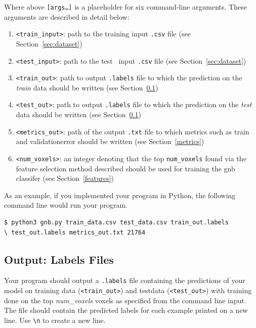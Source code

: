 \documentclass[11pt,addpoints,answers]{exam}
\begin{document}
Where above \texttt{[args\dots]} is a placeholder for six command-line arguments. These arguments are described in detail below:
\begin{enumerate}
    \item \texttt{<train\_input>}: path to the training input \texttt{.csv} file (see Section~\ref{sec:dataset})
    \item \texttt{<test\_input>}: path to the test \ input \texttt{.csv} file (see Section~\ref{sec:dataset})
    \item \texttt{<train\_out>}: path to output \texttt{.labels} file to which the prediction on the \emph{train} data should be written (see Section~\ref{output})
    \item \texttt{<test\_out>}: path to output \texttt{.labels} file to which the prediction on the \emph{test} data should be written (see Section~\ref{output})
     \item \texttt{<metrics\_out>}: path of the output \texttt{.txt} file to which metrics such as train and validation\thinspace error should be written  (see Section~\ref{metrics})
    \item \texttt{<num\_voxels>}: an integer denoting that the top \texttt{num\_voxels} found via the feature selection method described should be used for training the gnb classifer (see Section~\ref{features})

\end{enumerate}

As an example, if you implemented your program in Python, the following command line would run your program.
\\
\begin{lstlisting}[language=Shell]
$ python3 gnb.py train_data.csv test_data.csv train_out.labels 
\ test_out.labels metrics_out.txt 21764

\end{lstlisting}

\subsection{Output: Labels Files} \label{output}
Your program should output a \texttt{.labels} file containing the predictions of your model on training data (\texttt{<train\_out>}) and test\thinspace data (\texttt{<test\_out>}) with training done on the top \textit{num\_voxels} voxels as specified from the command line input. The file should contain the predicted labels for each example printed on a new line. Use \lstinline{\n} to create a new line. 
\end{document}
